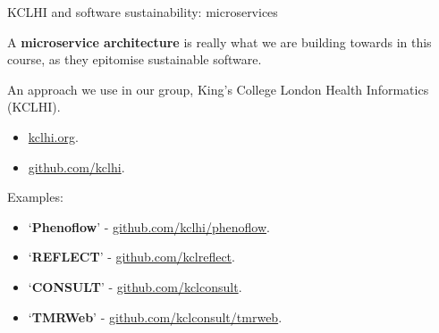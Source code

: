 \documentclass[10pt, dvipsnames, table, aspectratio=169]{beamer}
\begin{document}

\begin{frame}[fragile]{KCLHI and software sustainability: microservices}

A \textbf{microservice architecture} is really what we are building towards in this course, as they epitomise sustainable software.

An approach we use in our group, King's College London Health Informatics (KCLHI).

\begin{itemize}

    \item \href{https://kclhi.org}{kclhi.org}.
    
    \item \href{https://github.com/kclhi}{github.com/kclhi}.
    
\end{itemize}

Examples:

\begin{itemize}
    
    \item `\textbf{Phenoflow}' - \href{https://github.com/kclhi/phenoflow}{github.com/kclhi/phenoflow}. 
    \item `\textbf{REFLECT}' - \href{https://github.com/kclreflect}{github.com/kclreflect}.   
    \item `\textbf{CONSULT}' - \href{https://github.com/kclconsult}{github.com/kclconsult}.
    \item `\textbf{TMRWeb}' - \href{https://github.com/kclconsult/tmrweb}{github.com/kclconsult/tmrweb}.

\end{itemize}

\end{frame}
\end{document}
